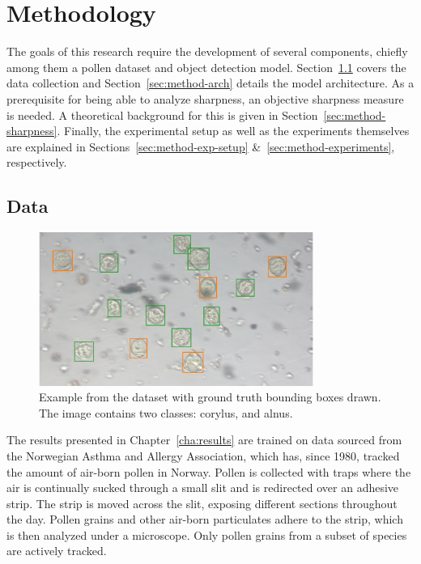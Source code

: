 \chapter{Methodology}\label{cha:method}

The goals of this research require the development of several components, chiefly among them a pollen dataset and object detection model.
Section~\ref{sec:method-dataset} covers the data collection and Section~\ref{sec:method-arch} details the model architecture.
As a prerequisite for being able to analyze sharpness, an objective sharpness measure is needed.
A theoretical background for this is given in Section~\ref{sec:method-sharpness}.
Finally, the experimental setup as well as the experiments themselves are explained in Sections~\ref{sec:method-exp-setup} \&~\ref{sec:method-experiments}, respectively.

\section{Data}\label{sec:method-dataset}

\begin{figure}[htbp]
  \centering
  \includegraphics[width=0.8\textwidth]{figs/method/Snap-057.png}
  \caption[Dataset example]{Example from the dataset with ground truth bounding boxes drawn.
The image contains two classes: \textcolor{corylus}{corylus}, and \textcolor{alnus}{alnus}.}\label{fig:dataset-sample}
\end{figure}

The results presented in Chapter~\ref{cha:results} are trained on data sourced from the Norwegian Asthma and Allergy Association, which has, since 1980, tracked the amount of air-born pollen in Norway.
Pollen is collected with traps where the air is continually sucked through a small slit and is redirected over an adhesive strip.
The strip is moved across the slit, exposing different sections throughout the day.
Pollen grains and other air-born particulates adhere to the strip, which is then analyzed under a microscope.
Only pollen grains from a subset of species are actively tracked.


